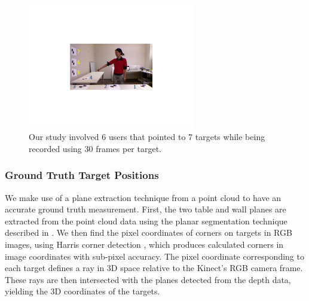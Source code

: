 \begin{figure}[ht!]
\centering
\includegraphics[width=0.65\textwidth]{pics/data_collection_crop}
\caption{Our study involved 6 users that pointed to 7 targets while being recorded using 30 frames per target.}
\label{fig:ground_truth_targets}
\end{figure}

\subsubsection{Ground Truth Target Positions}
\label{sec:ground_truth_points}

We make use of a plane extraction technique from a point cloud to have an accurate ground truth measurement. First, the two table and wall planes are extracted from the point cloud data using the planar segmentation technique described in \cite{trevor2013segmentation}. We then find the pixel coordinates of corners on targets in RGB images, using Harris corner detection \cite{harris1988combined}, which produces calculated corners in image coordinates with sub-pixel accuracy. The pixel coordinate corresponding to each target defines a ray in 3D space relative to the Kinect's RGB camera frame. These rays are then intersected with the planes detected from the depth data, yielding the 3D coordinates of the targets.




